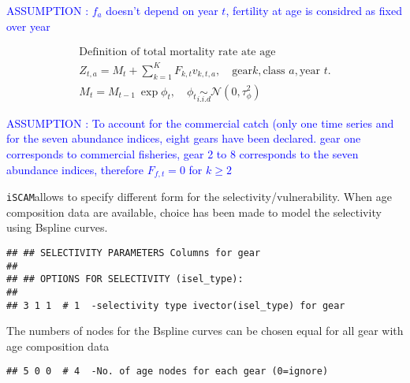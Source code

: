 \documentclass[a4paper]{article}\usepackage{graphicx, color}
\makeatletter
\newenvironment{kframe}{%
 \def\at@end@of@kframe{}%
 \ifinner\ifhmode%
  \def\at@end@of@kframe{\end{minipage}}%
  \begin{minipage}{\columnwidth}%
 \fi\fi%
 \def\FrameCommand##1{\hskip\@totalleftmargin \hskip-\fboxsep
 \colorbox{shadecolor}{##1}\hskip-\fboxsep
     \hskip-\linewidth \hskip-\@totalleftmargin \hskip\columnwidth}%
 \MakeFramed {\advance\hsize-\width
   \@totalleftmargin\z@ \linewidth\hsize
   \@setminipage}}%
 {\par\unskip\endMakeFramed%
 \at@end@of@kframe}
\newenvironment{knitrout}{}{} %
\newcommand{\ASS}[1]{\par \textcolor{blue}{ASSUMPTION : #1}\par}
\newcommand{\iscam}{\texttt{iSCAM}}
\makeatother
\begin{document}
\ASS{$f_a$ doesn't depend  on year $t$, fertility at  age is considred
  as fixed over year}

  
  
\begin{gather}
  \mbox{Definition of total mortality rate ate age}\\
  Z_{t,a}= M_t + \sum_{k=1}^K F_{k,t} v_{k, t,a}, \quad \mbox{gear} k,
  \mbox{class }a, \mbox{year }t.   \\
  M_t =M_{t-1}\ \exp{\phi_t},\quad \phi_t \underset{i.i.d}{\sim}\mathcal{N}\left(0, \tau_{\phi}^2\right)
\end{gather} 
\ASS{To account  for the commercial  catch (only one time  series and
for the seven abundance indices,  eight gears have been declared. gear
one corresponds  to commercial fisheries,  gear 2 to 8  corresponds to
the seven abundance indices, therefore $F_{f,t}=0$ for $k \geq 2$}

\iscam    allows     to    specify    different    form     for    the
selectivity/vulnerability.  When  age composition data  are available,
choice has been made to model the selectivity using Bspline curves.
\begin{knitrout}
\color{fgcolor}\begin{kframe}
\begin{verbatim}
## ## SELECTIVITY PARAMETERS Columns for gear                                   ##
## ## OPTIONS FOR SELECTIVITY (isel_type):                                      ##
## 3 1 1  # 1  -selectivity type ivector(isel_type) for gear
\end{verbatim}
\end{kframe}
\end{knitrout}


The numbers  of nodes for the  Bspline curves can be  chosen equal for
all gear with age composition data 

\begin{knitrout}
\color{fgcolor}\begin{kframe}
\begin{verbatim}
## 5 0 0  # 4  -No. of age nodes for each gear (0=ignore)
\end{verbatim}
\end{kframe}
\end{knitrout}
\end{document}
